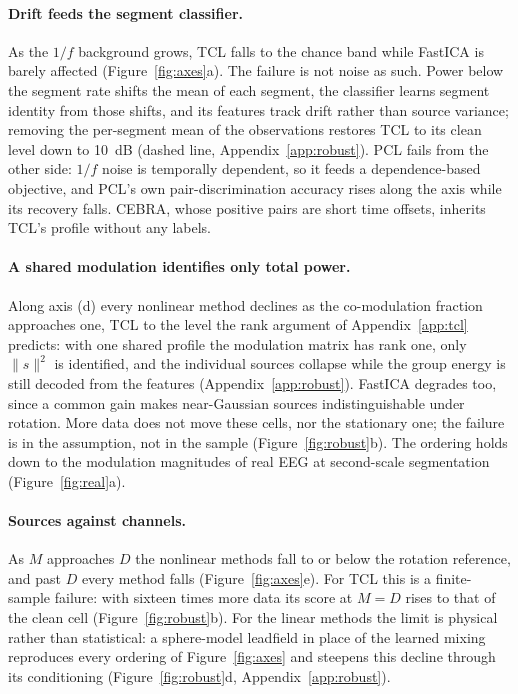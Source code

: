 \paragraph{Drift feeds the segment classifier.}
As the $1/f$ background grows, TCL falls to the chance band while FastICA is barely affected (Figure~\ref{fig:axes}a).
The failure is not noise as such.
Power below the segment rate shifts the mean of each segment, the classifier learns segment identity from those shifts, and its features track drift rather than source variance; removing the per-segment mean of the observations restores TCL to its clean level down to 10~dB (dashed line, Appendix~\ref{app:robust}).
PCL fails from the other side: $1/f$ noise is temporally dependent, so it feeds a dependence-based objective, and PCL's own pair-discrimination accuracy rises along the axis while its recovery falls.
CEBRA, whose positive pairs are short time offsets, inherits TCL's profile without any labels.

\paragraph{A shared modulation identifies only total power.}
Along axis (d) every nonlinear method declines as the co-modulation fraction approaches one, TCL to the level the rank argument of Appendix~\ref{app:tcl} predicts: with one shared profile the modulation matrix has rank one, only $\|s\|^2$ is identified, and the individual sources collapse while the group energy is still decoded from the features (Appendix~\ref{app:robust}).
FastICA degrades too, since a common gain makes near-Gaussian sources indistinguishable under rotation.
More data does not move these cells, nor the stationary one; the failure is in the assumption, not in the sample (Figure~\ref{fig:robust}b).
The ordering holds down to the modulation magnitudes of real EEG at second-scale segmentation (Figure~\ref{fig:real}a).

\paragraph{Sources against channels.}
As $M$ approaches $D$ the nonlinear methods fall to or below the rotation reference, and past $D$ every method falls (Figure~\ref{fig:axes}e).
For TCL this is a finite-sample failure: with sixteen times more data its score at $M = D$ rises to that of the clean cell (Figure~\ref{fig:robust}b).
For the linear methods the limit is physical rather than statistical: a sphere-model leadfield in place of the learned mixing reproduces every ordering of Figure~\ref{fig:axes} and steepens this decline through its conditioning (Figure~\ref{fig:robust}d, Appendix~\ref{app:robust}).
